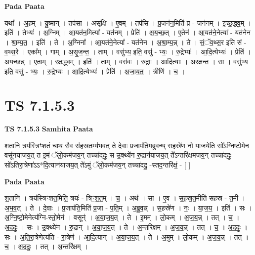 \documentclass[17pt]{extarticle}
\begin{document}
\textbf{Pada Paata} \newline

यथा᳚ । अ॒हम् । यु॒ष्मान् । तप॑सा । असृ॑क्षि । ए॒वम् । तप॑सि । प्र॒जन॑न॒मिति॑ प्र - जन॑नम् । इ॒च्छ॒द्ध्व॒म् । इति॑ । तेभ्यः॑ । अ॒ग्निम् । आ॒यत॑न॒मित्या᳚ - यत॑नम् । प्रेति॑ । अ॒य॒च्छ॒त् । ए॒तेन॑ । आ॒यत॑ने॒नेत्या᳚ - यत॑नेन । श्रा॒म्य॒त॒ । इति॑ । ते । अ॒ग्निना᳚ । आ॒यत॑ने॒नेत्या᳚ - यत॑नेन । अ॒श्रा॒म्य॒न्न् । ते । सं॒ॅव॒थ्स॒र इति॑ सं - व॒थ्स॒रे । एका᳚म् । गाम् । अ॒सृ॒ज॒न्त॒ । ताम् । वसु॑भ्य॒ इति॒ वसु॑ - भ्यः॒ । रु॒द्रेभ्यः॑ । आ॒दि॒त्येभ्यः॑ । प्रेति॑ । अ॒य॒च्छ॒न्न् । ए॒ताम् । र॒क्ष॒द्ध्व॒म् । इति॑ । ताम् । वस॑वः । रु॒द्राः । आ॒दि॒त्याः । अ॒र॒क्ष॒न्त॒ । सा । वसु॑भ्य॒ इति॒ वसु॑ - भ्यः॒ । रु॒द्रेभ्यः॑ । आ॒दि॒त्येभ्यः॑ । प्रेति॑ । अ॒जा॒य॒त॒ । त्रीणि॑ । च॒ ।  \newline





\section{ TS 7.1.5.3 }

\textbf{TS 7.1.5.3 } \newline
\textbf{Samhita Paata} \newline

श॒तानि॒ त्रय॑स्त्रिꣳशतं॒ चाथ॒ सैव स॑हस्रत॒म्य॑भव॒त् ते दे॒वाः प्र॒जाप॑तिमब्रुवन्थ् स॒हस्रे॑ण नो याज॒येति॒ सो᳚ऽग्निष्टो॒मेन॒ वसू॑नयाजय॒त् त इ॒मं ॅलो॒कम॑जय॒न् तच्चा॑ददुः॒ स उ॒क्थ्ये॑न रु॒द्रान॑याजय॒त् ते᳚ऽन्तरि॑क्षमजय॒न् तच्चा॑ददुः॒ सो॑ऽतिरा॒त्रेणा॑ऽऽ*दि॒त्यान॑याजय॒त् ते॑ऽमुं ॅलो॒कम॑जय॒न् तच्चा॑ददु॒ -स्तद॒न्तरि॑क्षं॒ - [  ] \newline

\textbf{Pada Paata} \newline

श॒तानि॑ । त्रय॑स्त्रिꣳशत॒मिति॒ त्रयः॑ - त्रिꣳ॒॒श॒त॒म् । च॒ । अथ॑ । सा । ए॒व । स॒ह॒स्र॒त॒मीति॑ सहस्र - त॒मी । अ॒भ॒व॒त् । ते । दे॒वाः । प्र॒जाप॑ति॒मिति॑ प्र॒जा - प॒ति॒म् । अ॒ब्रु॒व॒न्न् । स॒हस्रे॑ण । नः॒ । या॒ज॒य॒ । इति॑ । सः । अ॒ग्नि॒ष्टो॒मेनेत्य॑ग्नि-स्तो॒मेन॑ । वसून्॑ । अ॒या॒ज॒य॒त् । ते । इ॒मम् । लो॒कम् । अ॒ज॒य॒न्न् । तत् । च॒ । अ॒द॒दुः॒ । सः । उ॒क्थ्ये॑न । रु॒द्रान् । अ॒या॒ज॒य॒त् । ते । अ॒न्तरि॑क्षम् । अ॒ज॒य॒न्न् । तत् । च॒ । अ॒द॒दुः॒ । सः । अ॒ति॒रा॒त्रेणेत्य॑ति - रा॒त्रेण॑ । आ॒दि॒त्यान् । अ॒या॒ज॒य॒त् । ते । अ॒मुम् । लो॒कम् । अ॒ज॒य॒न्न् । तत् । च॒ । अ॒द॒दुः॒ । तत् । अ॒न्तरि॑क्षम् ।  \newline
\end{document}
